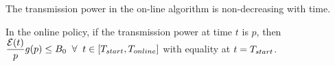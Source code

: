 \begin{lemma}
The transmission power in the on-line algorithm is non-decreasing with time.
\label{online_power}
\end{lemma}
%
%

\begin{lemma}
In the online policy, if the transmission power at time $t$ is $p$, then $\dfrac{\ETx(t)}{{p}}g(p) \le B_0\;\;\forall\;\; t\in [T_{\mbox{\scriptsize{start}}}, T_{\mbox{\scriptsize{online}}}]$ with equality at $t=T_{\mbox{\scriptsize{start}}}$.
\label{lemma_online_inequality}
\end{lemma}




